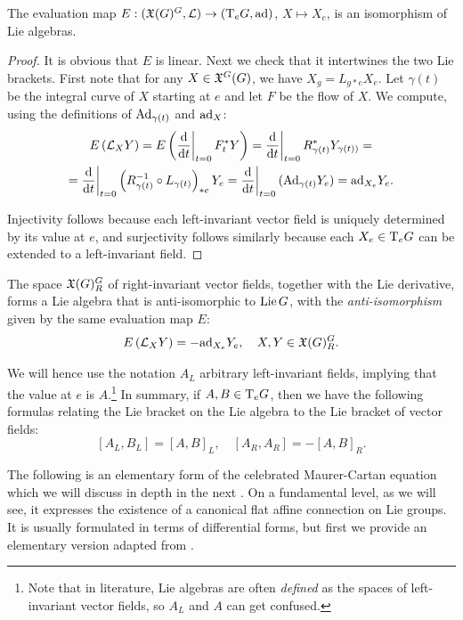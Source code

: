 \begin{thm}
    The evaluation map $E:(\mathfrak{X}(G)^G,\mathcal{L})\to (\mathrm{T}_eG,\mathrm{ad})$, $X\mapsto X_e$, is an isomorphism of Lie algebras.
\end{thm}
\begin{proof}
    It is obvious that $E$ is linear. Next we check that it intertwines the two Lie brackets. First note that for any $X\in \mathfrak{X}^G(G)$, we have $X_g=L_{g\ast e}X_e$. Let $\gamma(t)$ be the integral curve of $X$ starting at $e$ and let $F$ be the flow of $X$. We compute, using the definitions of $\mathrm{Ad}_{\gamma(t)}$ and $\mathrm{ad}_X$:
    \begin{multline}
        E\left(\Lie_X Y\right)=E\left(\restr{\frac{\dd}{\dd t}}{t=0} F^\ast_t Y\right)= \restr{\frac{\dd}{\dd t}}{t=0}R_{\gamma(t)}^{\ast}Y_{\gamma(t))}=\\=\restr{\frac{\dd}{\dd t}}{t=0}\left(R_{\gamma(t)}^{-1}\circ L_{\gamma(t)}\right)_{\ast e} Y_{e}=\restr{\frac{\dd}{\dd t}}{t=0}(\Ad_{\gamma(t)}Y_e)=\ad_{X_e} Y_e.
    \end{multline}

    Injectivity follows because each left-invariant vector field is uniquely determined by its value at $e$, and surjectivity follows similarly because each $X_e\in \mathrm{T}_eG$ can be extended to a left-invariant field.
\end{proof}
\begin{cor}
    The space $\mathfrak{X}(G)^G_R$ of right-invariant vector fields, together with the Lie derivative, forms a Lie algebra that is anti-isomorphic to $\operatorname{Lie} G$, with the \emph{anti-isomorphism} given by the same evaluation map $E$:
    \[E\left(\mathcal{L}_{X}Y\right)=-\mathrm{ad}_{X_e} Y_e,\quad X,Y\in\mathfrak{X}(G)^G_R.\]
\end{cor}

We will hence use the notation $A_L$ arbitrary left-invariant fields, implying that the value at $e$ is $A$.\footnote{Note that in literature, Lie algebras are often \emph{defined} as the spaces of left-invariant vector fields, so $A_L$ and $A$ can get confused.} In summary, if $A,B\in \mathrm{T}_eG$, then we have the following formulas relating the Lie bracket on the Lie algebra to the Lie bracket of vector fields:
\[[A_L,B_L]=[A,B]_L,\quad [A_R,A_R]=-[A,B]_R.\]


The following is an elementary form of the celebrated Maurer-Cartan equation which we will discuss in depth in the next \subsect. On a fundamental level, as we will see, it expresses the existence of a canonical flat affine connection on Lie groups. It is usually formulated in terms of differential forms, but first we provide an elementary version adapted from \cite{Onishchik}.

